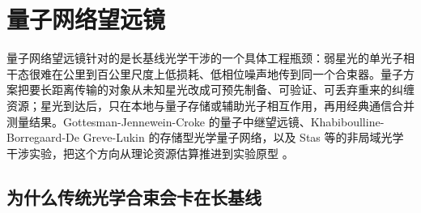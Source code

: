 \chapter{量子网络望远镜}
\label{chap:17}

\begin{chapteropening}
量子网络望远镜针对的是长基线光学干涉的一个具体工程瓶颈：弱星光的单光子相干态很难在公里到百公里尺度上低损耗、低相位噪声地传到同一个合束器。量子方案把要长距离传输的对象从未知星光改成可预先制备、可验证、可丢弃重来的纠缠资源；星光到达后，只在本地与量子存储或辅助光子相互作用，再用经典通信合并测量结果。Gottesman-Jennewein-Croke 的量子中继望远镜、Khabiboulline-Borregaard-De Greve-Lukin 的存储型光学量子网络，以及 Stas 等的非局域光学干涉实验，把这个方向从理论资源估算推进到实验原型 \citep{2012PhRvL.109g0503G,2019PhRvL.123g0504K,2026Natur.651..326S,2026PhRvA.113a2608P,2025PhRvR...7d3278Z,2023PhRvL.130p0801M}。
\end{chapteropening}

\section{为什么传统光学合束会卡在长基线}


